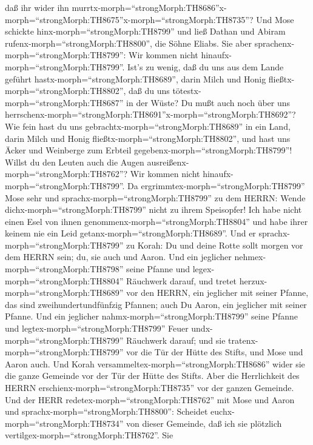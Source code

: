 daß ihr wider ihn
murrtx-morph=``strongMorph:TH8686''\textbar x-morph=``strongMorph:TH8675''x-morph=``strongMorph:TH8735''?
 Und Mose schickte hinx-morph=``strongMorph:TH8799'' und
ließ Dathan und Abiram rufenx-morph=``strongMorph:TH8800'', die Söhne
Eliabs. Sie aber sprachenx-morph=``strongMorph:TH8799'': Wir kommen
nicht hinaufx-morph=``strongMorph:TH8799''.  Ist's zu
wenig, daß du uns aus dem Lande geführt
hastx-morph=``strongMorph:TH8689'', darin Milch und Honig
fließtx-morph=``strongMorph:TH8802'', daß du uns
tötestx-morph=``strongMorph:TH8687'' in der Wüste? Du mußt auch noch
über uns
herrschenx-morph=``strongMorph:TH8691''x-morph=``strongMorph:TH8692''?
 Wie fein hast du uns
gebrachtx-morph=``strongMorph:TH8689'' in ein Land, darin Milch und
Honig fließtx-morph=``strongMorph:TH8802'', und hast uns Äcker und
Weinberge zum Erbteil gegebenx-morph=``strongMorph:TH8799''! Willst du
den Leuten auch die Augen ausreißenx-morph=``strongMorph:TH8762''? Wir
kommen nicht hinaufx-morph=``strongMorph:TH8799''.  Da
ergrimmtex-morph=``strongMorph:TH8799'' Mose sehr und
sprachx-morph=``strongMorph:TH8799'' zu dem HERRN: Wende
dichx-morph=``strongMorph:TH8799'' nicht zu ihrem Speisopfer! Ich habe
nicht einen Esel von ihnen genommenx-morph=``strongMorph:TH8804'' und
habe ihrer keinem nie ein Leid getanx-morph=``strongMorph:TH8689''.
 Und er sprachx-morph=``strongMorph:TH8799'' zu Korah: Du
und deine Rotte sollt morgen vor dem HERRN sein; du, sie auch und Aaron.
 Und ein jeglicher nehmex-morph=``strongMorph:TH8798''
seine Pfanne und legex-morph=``strongMorph:TH8804'' Räuchwerk darauf,
und tretet herzux-morph=``strongMorph:TH8689'' vor den HERRN, ein
jeglicher mit seiner Pfanne, das sind zweihundertundfünfzig Pfannen;
auch Du Aaron, ein jeglicher mit seiner Pfanne.  Und ein
jeglicher nahmx-morph=``strongMorph:TH8799'' seine Pfanne und
legtex-morph=``strongMorph:TH8799'' Feuer
undx-morph=``strongMorph:TH8799'' Räuchwerk darauf; und sie
tratenx-morph=``strongMorph:TH8799'' vor die Tür der Hütte des Stifts,
und Mose und Aaron auch.  Und Korah
versammeltex-morph=``strongMorph:TH8686'' wider sie die ganze Gemeinde
vor der Tür der Hütte des Stifts. Aber die Herrlichkeit des HERRN
erschienx-morph=``strongMorph:TH8735'' vor der ganzen Gemeinde.
 Und der HERR redetex-morph=``strongMorph:TH8762'' mit Mose
und Aaron und sprachx-morph=``strongMorph:TH8800'': 
Scheidet euchx-morph=``strongMorph:TH8734'' von dieser Gemeinde, daß ich
sie plötzlich vertilgex-morph=``strongMorph:TH8762''.  Sie
